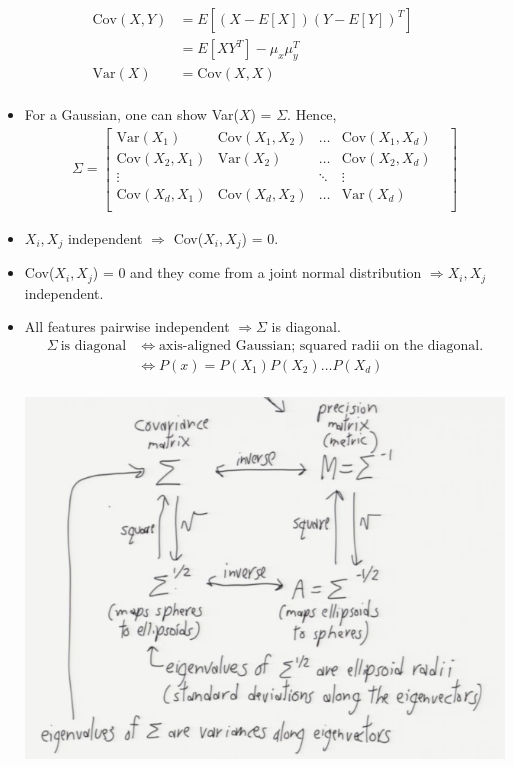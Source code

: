 \documentclass[10pt]{article}
\begin{document}
\begin{description}
\begin{itemize}
				\begin{align*}
					\text{Cov}(X, Y) &= E[(X - E[X])(Y - E[Y])^{T}]\\
									&= E[XY^{T}] - \mu_{x}\mu_{y}^{T}\\
					\text{Var}(X) &= \text{Cov}(X, X)\\
				\end{align*}
				\begin{itemize}
					\item For a Gaussian, one can show Var($X$) = $\Sigma$. Hence,
						\begin{align*}
							\Sigma =
								\begin{bmatrix}
									\text{Var}(X_{1}) & \text{Cov}(X_{1},X_{2}) & \dots & \text{Cov}(X_{1},X_{d})\\
									\text{Cov}(X_{2},X_{1})  & \text{Var}(X_{2}) & \dots & \text{Cov}(X_{2}, X_{d})\\
									\vdots & & \ddots & \vdots &\\
									\text{Cov}(X_{d},X_{1}) & \text{Cov}(X_{d},X_{2}) & \dots & \text{Var}(X_{d})\\
								\end{bmatrix}
						\end{align*}	
					\item $X_{i}, X_{j}$ independent $\Rightarrow$ Cov($X_{i}, X_{j}$) = 0.
					\item Cov($X_{i}, X_{j}$) = 0 and they come from a joint normal distribution $\Rightarrow X_{i}, X_{j}$ independent.
					\item All features pairwise independent $\Rightarrow \Sigma$ is diagonal.
						\begin{align*}
							\Sigma \ \text{is diagonal} &\Leftrightarrow \text{axis-aligned Gaussian; squared radii on the diagonal}.\\
							&\Leftrightarrow P(x) = P(X_{1})P(X_{2}) \dots P(X_{d})\\
						\end{align*}
						\begin{center}
							\includegraphics[scale=0.5]{images/chart}

\end{center}
\end{itemize}
\end{itemize}
\end{description}
\end{document}
